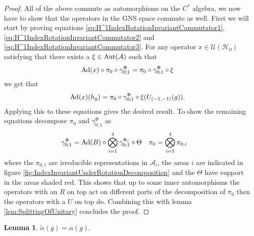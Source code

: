 \documentclass[12pt,a4paper,twoside]{article}
\let\originalleft\left
\let\originalright\right
\renewcommand{\left}{\mathopen{}\mathclose\bgroup\originalleft}
\renewcommand{\right}{\aftergroup\egroup\originalright}
\newcommand{\UU}{\mathcal U}
\newcommand{\HH}{\mathcal H}
\renewcommand{\AA}{\mathcal A}
\newcommand{\Ad}[1]{\textrm{Ad}\left(#1\right)}
\newcommand{\Aut}[1]{\textrm{Aut}\left(#1\right)}
\theoremstyle{definition}
\newtheorem{lemma}[theorem]{Lemma}
\numberwithin{equation}{section}
\begin{document}
\begin{proof}
	All of the above commute as automorphisms on the $C^*$ algebra, we now have to show that the operators in the GNS space commute as well. First we will start by proving equations \eqref{eq:H^1IndexRotationInvariantCommutator1}, \eqref{eq:H^1IndexRotationInvariantCommutator2} and \eqref{eq:H^1IndexRotationInvariantCommutator3}. For any operator $x\in\UU(\HH_0)$ satisfying that there exists a $\xi\in\Aut{\AA}$ such that
	\begin{equation}
		\Ad{x}\circ\pi_0\circ\gamma^{\Phi}_{0;1}=\pi_0\circ\gamma^{\Phi}_{0;1}\circ\xi
	\end{equation}
	we get that
	\begin{equation}
		\Ad{x}(h_g)=\pi_0\circ\gamma^\Phi_{0;1}\circ\xi(U_{(-1,-1)}(g)).
	\end{equation}
	Applying this to these equations gives the desired result. To show the remaining equations decompose $\pi_0$ and $\gamma^\Phi_{0;1}$ as
	\begin{align}
		\gamma^\Phi_{0;1}&=\Ad{B}\circ\bigotimes_{i=1}^4\gamma^{\Phi_i}_{0;1}\circ\Theta&\pi_0&=\bigotimes_{i=1}^4\pi_{0,i}
	\end{align}
	where the $\pi_{0,i}$ are irreducible representations in $\AA_i$, the areas $i$ are indicated in figure \ref{fig:IndexInvariantUnderRotationDecomposition} and the $\Theta$ have support in the areas shaded red. This shows that up to some inner automorphisms the operators with an $R$ on top act on different parts of the decomposition of $\pi_0$ then the operators with a $U$ on top do. Combining this with lemma \ref{lem:SplittingOfUnitary} concludes the proof.
\end{proof}
\begin{lemma}
	$\tilde{\alpha}(g)=\alpha(g)$.
\end{lemma}
\end{document}
